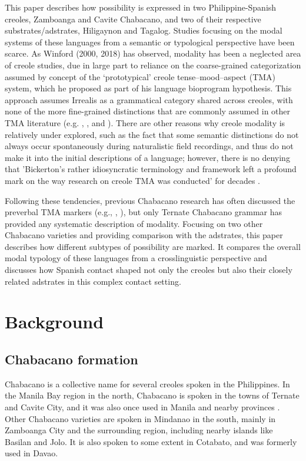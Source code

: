This paper describes how possibility is expressed in two Philippine-Spanish creoles, Zamboanga and Cavite Chabacano, and two of their respective substrates/adstrates, Hiligaynon and Tagalog. Studies focusing on the modal systems of these languages from a semantic or typological perspective have been scarce. As Winford (2000, 2018) has observed, modality has been a neglected area of creole studies, due in large part to reliance on the coarse-grained categorization assumed by  concept of the ‘prototypical’ creole tense–mood–aspect (TMA) system, which he proposed as part of his language bioprogram hypothesis. This approach assumes Irrealis as a grammatical category shared across creoles, with none of the more fine-grained distinctions that are commonly assumed in other TMA literature (e.g. \citealt{Dahl1985}, \citealt{BybeeEtAl1994}, and \citealt{Palmer2001}). There are other reasons why creole modality is relatively under explored, such as the fact that some semantic distinctions do not always occur spontaneously during naturalistic field recordings, and thus do not make it into the initial descriptions of a language; however, there is no denying that 'Bickerton’s rather idiosyncratic terminology and framework left a profound mark on the way research on creole TMA was conducted' for decades \citep[1]{Winford2018}. 

Following these tendencies, previous Chabacano research has often discussed the preverbal TMA markers (e.g., \citealt{Forman1972}, \citealt{LipskiSantoro2007}), but only  Ternate Chabacano grammar has provided any systematic description of modality. Focusing on two other Chabacano varieties and providing comparison with the adstrates, this paper describes how different subtypes of possibility are marked. It compares the overall modal typology of these languages from a crosslinguistic perspective and discusses how Spanish contact shaped not only the creoles but also their closely related adstrates in this complex contact setting. 

\section{Background}
\subsection{Chabacano formation}

Chabacano is a collective name for several creoles spoken in the Philippines. In the Manila Bay region in the north, Chabacano is spoken in the towns of Ternate and Cavite City, and it was also once used in Manila and nearby provinces \citep{Fernández2011}. Other Chabacano varieties are spoken in Mindanao in the south, mainly in Zamboanga City and the surrounding region, including nearby islands like Basilan and Jolo. It is also spoken to some extent in Cotabato, and was formerly used in Davao. 

